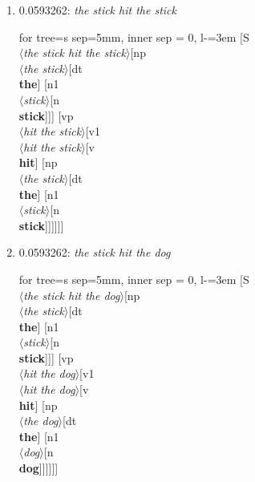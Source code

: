 \documentclass[11pt]{article}
\begin{document}
\begin{enumerate}
	\item  0.0593262: \textit{the stick hit the stick} \\[0.5em]
	\begin{forest}
	for tree={s sep=5mm, inner sep = 0, l-=3em}
	[S\\$\langle$\textit{the stick hit the stick}$\rangle$[np\\$\langle$\textit{the stick}$\rangle$[dt\\\textbf{the}] [n1\\$\langle$\textit{stick}$\rangle$[n\\\textbf{stick}]]] [vp\\$\langle$\textit{hit the stick}$\rangle$[v1\\$\langle$\textit{hit the stick}$\rangle$[v\\\textbf{hit}] [np\\$\langle$\textit{the stick}$\rangle$[dt\\\textbf{the}] [n1\\$\langle$\textit{stick}$\rangle$[n\\\textbf{stick}]]]]]]
	\end{forest}
	\newpage

	\item  0.0593262: \textit{the stick hit the dog} \\[0.5em]
	\begin{forest}
	for tree={s sep=5mm, inner sep = 0, l-=3em}
	[S\\$\langle$\textit{the stick hit the dog}$\rangle$[np\\$\langle$\textit{the stick}$\rangle$[dt\\\textbf{the}] [n1\\$\langle$\textit{stick}$\rangle$[n\\\textbf{stick}]]] [vp\\$\langle$\textit{hit the dog}$\rangle$[v1\\$\langle$\textit{hit the dog}$\rangle$[v\\\textbf{hit}] [np\\$\langle$\textit{the dog}$\rangle$[dt\\\textbf{the}] [n1\\$\langle$\textit{dog}$\rangle$[n\\\textbf{dog}]]]]]]
	\end{forest}
	\newpage


\end{enumerate}
\end{document}
